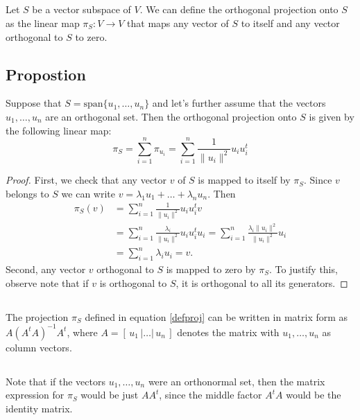\documentclass{proc-l}
\theoremstyle{definition}
\theoremstyle{remark}
\numberwithin{equation}{section}
\begin{document}
\subsection{}
Let $S$ be a vector subspace of $V$. We can define the orthogonal projection onto $S$ as the linear map $\pi_S: V\to V$ that maps any vector of $S$ to itself and any vector orthogonal to $S$ to zero. 

\subsection{Propostion}
Suppose that $S=\textrm{span}\{u_1,\ldots, u_n\}$ and let's further assume that the vectors $u_1,\ldots, u_n$ are an orthogonal set. Then the orthogonal projection onto $S$ is given by the following linear map:
\begin{equation}\label{defproj}
\pi_{S} = \sum_{i=1}^n \pi_{u_i} = \sum_{i=1}^n \frac{1}{\| u_i \|^2} u_i u_i^t
\end{equation}

\begin{proof}
First, we check that any vector $v$ of $S$ is mapped to itself by $\pi_S$. Since $v$ belongs to $S$ we can write $v = \lambda_1 u_1 + \ldots + \lambda_n u_n$. Then
\begin{align*}
\pi_S(v) &=  \sum_{i=1}^n \frac{1}{\| u_i \|^2} u_i u_i^t v\\ 
&= \sum_{i=1}^n \frac{\lambda_i}{\| u_i \|^2} u_i u_i^t u_i = \sum_{i=1}^n \frac{\lambda_i \| u_i \|^2}{\| u_i \|^2} u_i\\
&= \sum_{i=1}^n \lambda_i u_i = v.
\end{align*}
Second, any vector $v$ orthogonal to $S$ is mapped to zero by $\pi_S$. To justify this, observe note that if $v$ is orthogonal to $S$, it is orthogonal to all its generators.
\end{proof}

\subsection{}
The projection $\pi_S$ defined in equation \ref{defproj} can be written in matrix form as $A(A^tA)^{-1}A^t$, where $A=[\,u_1\,|\ldots|\,u_n\,]$ denotes the matrix with $u_1,\ldots,u_n$ as column vectors.

\subsection{}
Note that if the vectors $u_1, \ldots, u_n$ were an orthonormal set, then the matrix expression for $\pi_S$ would be just $AA^t$, since the middle factor $A^tA$ would be the identity matrix.
\end{document}
